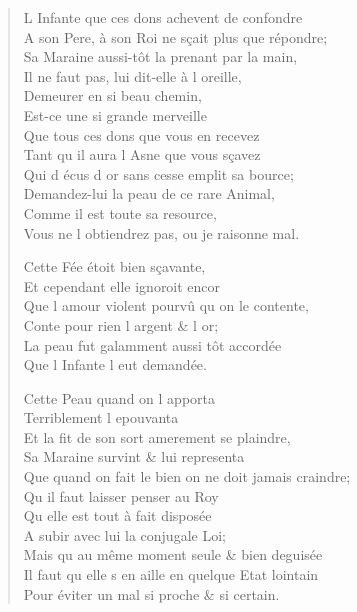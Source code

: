 \begin{verse}
L\textquotesingle{} Infante que ces dons achevent de confondre \\
A son Pere, à son Roi ne sçait plus que répondre; \\
Sa Maraine aussi-tôt la prenant par la main, \\
\vin Il ne faut pas, lui dit-elle à l\textquotesingle{} oreille, \\
\vin Demeurer en si beau chemin, \\
\vin Est-ce une si grande merveille \\
\vin Que tous ces dons que vous en recevez \\
\vin Tant qu\textquotesingle{} il aura l\textquotesingle{} Asne que vous sçavez \\
\vin Qui d\textquotesingle{} écus d\textquotesingle{} or sans cesse emplit sa bource; \\
Demandez-lui la peau de ce rare Animal, \\
\vin Comme il est toute sa resource, \\
Vous ne l\textquotesingle{} obtiendrez pas, ou je raisonne mal.

\vin Cette Fée étoit bien sçavante, \\
\vin Et cependant elle ignoroit encor \\
Que l\textquotesingle{} amour violent pourvû qu\textquotesingle{} on le contente, \\
\vin Conte pour rien l\textquotesingle{} argent \& l\textquotesingle{} or; \\
La peau fut galamment aussi tôt accordée \\
\vin Que l\textquotesingle{} Infante l\textquotesingle{} eut demandée.

\vin Cette Peau quand on l\textquotesingle{} apporta \\
\vin Terriblement l\textquotesingle{} epouvanta \\
Et la fit de son sort amerement se plaindre, \\
Sa Maraine survint \& lui representa \\
Que quand on fait le bien on ne doit jamais craindre; \\
\vin Qu\textquotesingle{} il faut laisser penser au Roy \\
\vin Qu\textquotesingle{} elle est tout à fait disposée \\
A subir avec lui la conjugale Loi; \\
Mais qu\textquotesingle{} au même moment seule \& bien deguisée \\
Il faut qu\textquotesingle{} elle s\textquotesingle{} en aille en quelque Etat lointain \\
Pour éviter un mal si proche \& si certain.


\end{verse}

